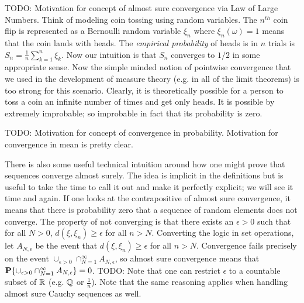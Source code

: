 TODO: Motivation for concept of almost sure convergence via Law of
Large Numbers.  Think of modeling coin tossing using random
variables.  The $n^{th}$ coin flip is represented as a Bernoulli
random variable $\xi_n$ where $\xi_n(\omega) = 1$ means that the coin
lands with heads.  The \emph{empirical probability} of heads is in $n$
trials is $S_n = \frac{1}{n} \sum_{k=1}^n \xi_k$.  Now our intuition
is that $S_n$ converges to $1/2$ in some appropriate sense.  Now the
simple minded notion of pointwise convergence that we used in the
development of measure theory (e.g. in all of the limit theorems)
is too strong for this scenario.  Clearly, it is theoretically
possible for a person to toss a coin an infinite number of times and
get only heads.  It is possible by extremely improbable; so improbable
in fact that its probability is zero.

TODO: Motivation for concept of convergence in probability.
Motivation for convergence in mean is pretty clear.

There is also some useful technical intuition around how one might
prove that sequences converge almost surely.  The idea is implicit in
the definitions but is useful to take the time to call it out and make
it perfectly explicit; we will see it time and again.  If one looks at the contrapositive of almost
sure convergence, it means that there is probability zero that a
sequence of random elements does not converge.  The property of not
converging is that there exists an $\epsilon >0$ such that for all $N
> 0$, $d(\xi, \xi_n) \geq \epsilon$ for all $n > N$. Converting the
logic in set operations, let $A_{N, \epsilon}$ be the event that 
$d(\xi, \xi_n) \geq \epsilon$ for all $n > N$.  Convergence fails
precisely on the event $\cup_{\epsilon > 0} \cap_{N=1}^\infty A_{N,
  \epsilon}$, so almost sure convergence means that $\textbf{P}\{\cup_{\epsilon > 0} \cap_{N=1}^\infty A_{N,
  \epsilon}\} = 0$.  TODO: Note that one can restrict $\epsilon$ to a
countable subset of $\mathbb{R}$ (e.g. $\mathbb{Q}$ or $\frac{1}{n}$).  Note that the same reasoning applies when handling
almost sure Cauchy sequences as well.


